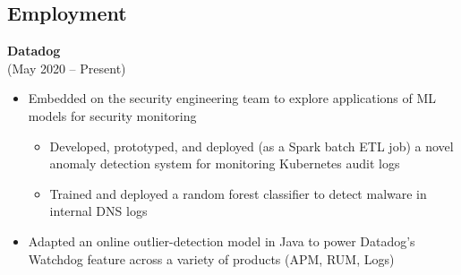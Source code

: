 \documentclass{res}
\begin{document}
 
\setlength{\parskip}{10pt}
\renewcommand{\labelitemi}{\scriptsize$\bullet$} 

\address{\hspace{2pt}} %
\address{\href{http://maxlivingston.org}{maxlivingston.org}}

\begin{resume}
  \setlength{\sectionskip}{0pt}
  \section{Employment}
  \setlength{\sectionskip}{5pt}
  \vspace{2pt}
    {\bf Datadog} \\ 
     \hspace{3pt} (May 2020 -- Present)
    \vspace{2pt}
  \begin{itemize} \itemsep 2.0pt \parskip 2.0pt %
  \item Embedded on the security engineering team to explore applications of ML models for security monitoring
    \setlength{\parskip}{-2pt} 
    \begin{itemize}
      \setlength{\itemsep}{1.0pt}
    \item Developed, prototyped, and deployed (as a Spark batch ETL job) a novel anomaly detection system for monitoring Kubernetes audit logs
    \item Trained and deployed a random forest classifier to detect malware in internal DNS logs
    \end{itemize}
    \setlength{\parskip}{2.0pt} 
      
  \item Adapted an online outlier-detection model in Java to power Datadog's Watchdog feature across a variety of products (APM, RUM, Logs)

  \end{itemize}
  

\end{resume}
\end{document}
